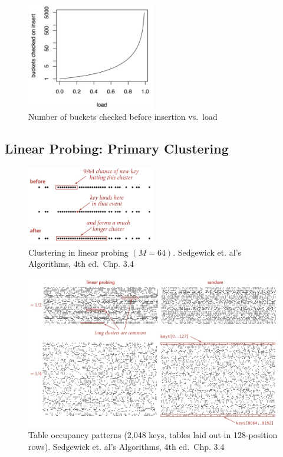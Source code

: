 \documentclass[
  10pt,
  english,
  letterpaper,
,tablecaptionabove
]{scrartcl}
\begin{document}
\begin{figure}
\centering
\includegraphics[width=0.5\textwidth,height=\textheight]{images/2.png}
\caption{Number of buckets checked before insertion vs.~load}
\end{figure}

\hypertarget{linear-probing-primary-clustering}{%
\subsection{Linear Probing: Primary
Clustering}\label{linear-probing-primary-clustering}}

\begin{figure}
\centering
\includegraphics[width=0.5\textwidth,height=\textheight]{images/3.png}
\caption{Clustering in linear probing \((M = 64)\). Sedgewick et. al's
Algorithms, 4th ed.~Chp. 3.4}
\end{figure}

\begin{figure}
\centering
\includegraphics[width=1\textwidth,height=\textheight]{images/4.png}
\caption{Table occupancy patterns (2,048 keys, tables laid out in
128-position rows). Sedgewick et. al's Algorithms, 4th ed.~Chp. 3.4}
\end{figure}
\end{document}
